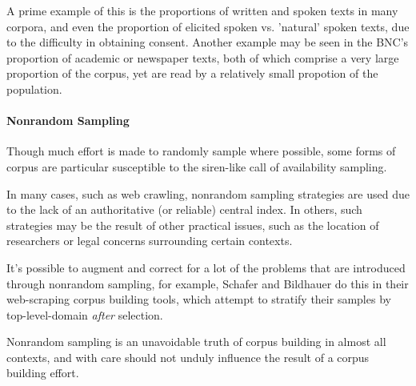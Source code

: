 A prime example of this is the proportions of written and spoken texts in many corpora, and even the proportion of elicited spoken vs. 'natural' spoken texts, due to the difficulty in obtaining consent.  Another example may be seen in the BNC's proportion of academic or newspaper texts, both of which comprise a very large proportion of the corpus, yet are read by a relatively small propotion of the population.





\paragraph{Nonrandom Sampling}
Though much effort is made to randomly sample where possible, some forms of corpus are particular susceptible to the siren-like call of availability sampling.

In many cases, such as web crawling, nonrandom sampling strategies are used due to the lack of an authoritative (or reliable) central index.  In others, such strategies may be the result of other practical issues, such as the location of researchers or legal concerns surrounding certain contexts.

It's possible to augment and correct for a lot of the problems that are introduced through nonrandom sampling, for example, Schafer and Bildhauer do this in their web-scraping corpus building tools, which attempt to stratify their samples by top-level-domain \textsl{after} selection\cite{schafer2014focused}.

Nonrandom sampling is an unavoidable truth of corpus building in almost all contexts, and with care should not unduly influence the result of a corpus building effort.




